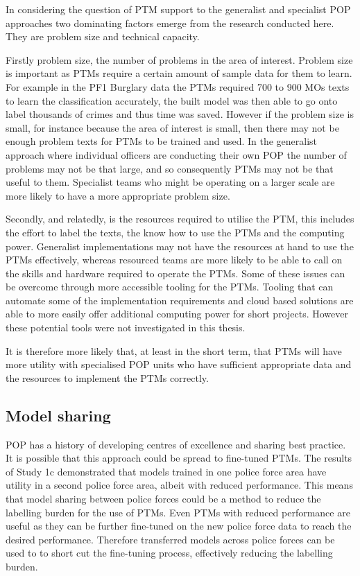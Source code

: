 In considering the question of PTM support to the generalist and specialist POP approaches two dominating factors emerge from the research conducted here. They are problem size and technical capacity. 

Firstly problem size, the number of problems in the area of interest. Problem size is important as PTMs require a certain amount of sample data for them to learn. For example in the PF1 Burglary data the PTMs required 700 to 900 MOs texts to learn the classification accurately, the built model was then able to go onto label thousands of crimes and thus time was saved. However if the problem size is small, for instance because the area of interest is small, then there may not be enough problem texts for PTMs to be trained and used.  In the generalist approach where individual officers are conducting their own POP the number of  problems may not be that large, and so consequently PTMs may not be that useful to them. Specialist teams who might be operating on a larger scale are more likely to have a more appropriate problem size.  

Secondly, and relatedly, is the resources required to utilise the PTM, this includes the effort to label the texts, the know how to use the PTMs and the computing power. Generalist implementations may not have the resources at hand to use the PTMs effectively, whereas resourced teams are more likely to be able to call on the skills and hardware required to operate the PTMs. Some of these issues can be overcome through more accessible tooling for the PTMs. Tooling that can automate some of the implementation requirements and cloud based solutions are able to more easily offer additional computing power for short projects. However these potential tools were not investigated in this thesis.

It is therefore more likely that, at least in the short term, that PTMs will have more utility with specialised POP units who have sufficient appropriate data and the resources to implement the PTMs correctly.

\subsection{Model sharing} POP has a history of developing centres of excellence and sharing best practice. It is possible that this approach could be spread to fine-tuned PTMs. The results of Study 1c demonstrated that models trained in one police force area have utility in a second police force area, albeit with reduced performance. This means that model sharing between police forces could be a method to reduce the labelling burden for the use of PTMs. Even PTMs with reduced performance are useful as they can be further fine-tuned on the new police force data to reach the desired performance.  Therefore transferred models across police forces can be used to to short cut the fine-tuning process, effectively reducing the labelling burden. 


